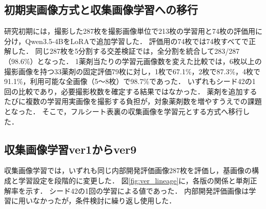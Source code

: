 \documentclass[uplatex,dvipdfmx]{jsarticle}
\begin{document}
\subsection{初期実画像方式と収集画像学習への移行}

研究初期には，撮影した287枚を撮影画像単位で213枚の学習用と74枚の評価用に分け，Qwen3.5-4BをLoRAで追加学習した．
評価用の74枚では74枚すべてで正解した．
同じ287枚を5分割する交差検証では，全分割を統合して283/287（98.6\%）となった．
1薬剤当たりの学習元画像数を変えた比較では，6枚以上の撮影画像を持つ33薬剤の固定評価79枚に対し，1枚で67.1\%，2枚で87.3\%，4枚で91.1\%，利用可能な全画像（5〜8枚）で98.7\%であった．
いずれもシード42の1回の比較であり，必要撮影枚数を確定する結果ではなかった．
薬剤を追加するたびに複数の学習用実画像を撮影する負担が，対象薬剤数を増やすうえでの課題となった．
そこで，フルシート表裏の収集画像を学習元とする方式へ移行した．

\subsection{収集画像学習ver1からver9}\label{sec:ver1_v9}

収集画像学習では，いずれも同じ内部開発評価画像287枚を評価し，基画像の構成と学習設定を段階的に変更した．
図\ref{fig:ver_lineage}に，各版の関係と単剤正解率を示す．
シード42の1回の学習による値であった．
内部開発評価画像は学習に用いなかったが，条件検討に繰り返し使用した．
\end{document}
